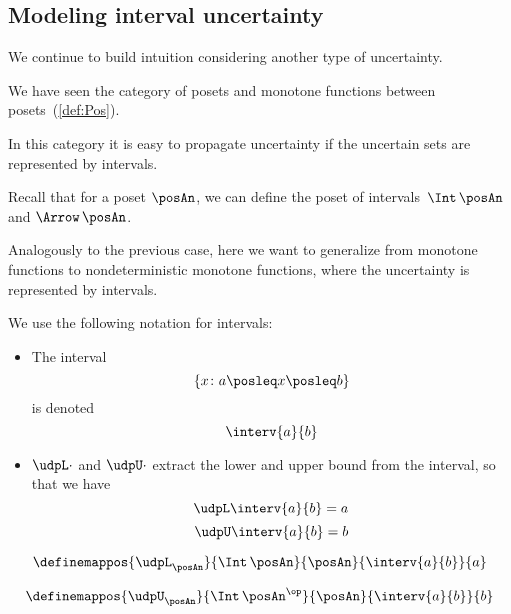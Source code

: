 \subsection{Modeling interval uncertainty}

We continue to build intuition considering another type of uncertainty.

We have seen the category \Pos of posets and monotone functions between posets~(\cref{def:Pos}). 

In this category it is easy to propagate uncertainty if the uncertain sets are represented by intervals. 

Recall that for a poset $\posAn$, we can define the poset of intervals~$\Int\,\posAn$
and $\Arrow\,\posAn$.


Analogously to the previous case, here we want to generalize from monotone functions to nondeterministic monotone functions, where the uncertainty is represented by intervals.

We use the following notation for intervals:
\begin{itemize}
\item The interval
 \begin{equation}\label{eq:interv-1}
    \{x\colon a \posleq x \posleq b\}
 \end{equation}
 is denoted 
 \begin{equation}\label{eq:interv-2}
    \interv{a}{b}
\end{equation}
\item $\udpL\cdot$ and $\udpU\cdot$ extract the lower and upper bound from the interval, so that we have
\begin{equation}\label{eq:interv-L}
    \udpL \interv{a}{b} = a
\end{equation}
\begin{equation}\label{eq:interv-U}
    \udpU \interv{a}{b} = b
\end{equation}
\end{itemize}

\begin{equation}\label{eq:interv-L-def}
    \definemappos{\udpL_{\posAn}}{\Int\,\posAn}{\posAn}%
    {\interv{a}{b}}{ a }
\end{equation}

\begin{equation}\label{eq:interv-U-def}
    \definemappos{\udpU_{\posAn}}{\Int\,\posAn^{\op}}{\posAn}%
    {\interv{a}{b}}{ b }
\end{equation}


